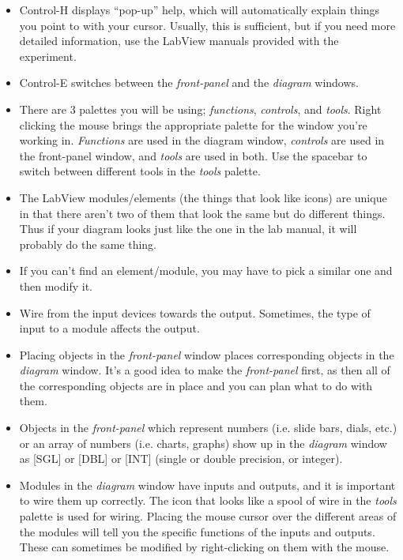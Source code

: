 \documentclass{../lab}
\begin{document}
\begin{itemize}
    \item Control-H displays ``pop-up'' help, which will automatically explain things you point to with your cursor. Usually, this is sufficient, but if you need more detailed information, use the LabView manuals provided with the experiment.

    \item Control-E switches between the \emph{front-panel} and the \emph{diagram} windows.

    \item There are 3 palettes you will be using; \emph{functions}, \emph{controls}, and \emph{tools}. Right clicking the mouse brings the appropriate palette for the window you're working in. \emph{Functions }are used in the diagram window, \emph{controls }are used\emph{ }in the front-panel window, and \emph{tools} are used in both. Use the spacebar to switch between different tools in the \emph{tools }palette.

    \item The LabView modules/elements (the things that look like icons) are unique in that there aren't two of them that look the same but do different things. Thus if your diagram looks just like the one in the lab manual, it will probably do the same thing.

    \item If you can't find an element/module, you may have to pick a similar one and then modify it.

    \item Wire from the input devices towards the output. Sometimes, the type of input to a module affects the output.

    \item Placing objects in the \emph{front-panel} window places corresponding objects in the \emph{diagram} window. It's a good idea to make the \emph{front-panel} first, as then all of the corresponding objects are in place and you can plan what to do with them.

    \item Objects in the \emph{front-panel} which represent numbers (i.e. slide bars, dials, etc.) or an array of numbers (i.e. charts, graphs) show up in the \emph{diagram} window as [SGL] or [DBL] or [INT] (single or double precision, or integer).

    \item Modules in the \emph{diagram} window have inputs and outputs, and it is important to wire them up correctly. The icon that looks like a spool of wire in the \emph{tools} palette is used for wiring. Placing the mouse cursor over the different areas of the modules will tell you the specific functions of the inputs and outputs. These can sometimes be modified by right-clicking on them with the mouse.

\end{itemize}
\end{document}
